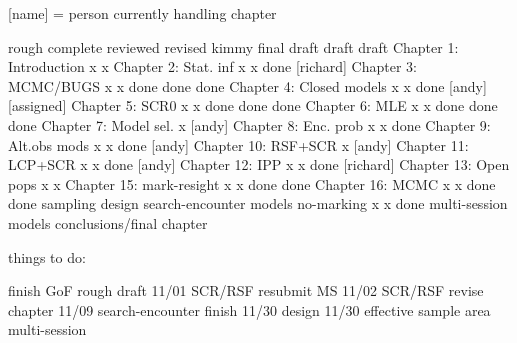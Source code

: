 [name] = person currently handling chapter


                          rough   complete reviewed  revised kimmy  final draft
                          draft    draft
Chapter 1: Introduction       x       x
Chapter 2: Stat. inf          x       x     done    [richard]
Chapter 3: MCMC/BUGS          x       x     done     done    done
Chapter 4: Closed models      x       x     done    [andy]  [assigned]
Chapter 5: SCR0               x       x     done     done    done
Chapter 6: MLE                x       x     done     done    done
Chapter 7: Model sel.         x     [andy]
Chapter 8: Enc. prob          x       x     done
Chapter 9: Alt.obs mods       x       x     done    [andy] 
Chapter 10: RSF+SCR           x    [andy]
Chapter 11: LCP+SCR           x       x     done    [andy]
Chapter 12: IPP               x       x     done    [richard]
Chapter 13: Open pops         x       x
Chapter 15: mark-resight      x       x     done     done 
Chapter 16: MCMC              x       x     done     done
sampling design     
search-encounter models
no-marking                    x       x     done
multi-session models
conclusions/final chapter





things to do:

finish GoF rough draft   11/01
SCR/RSF resubmit MS      11/02
SCR/RSF revise chapter   11/09
search-encounter finish  11/30
design                   11/30
effective sample area  
multi-session
